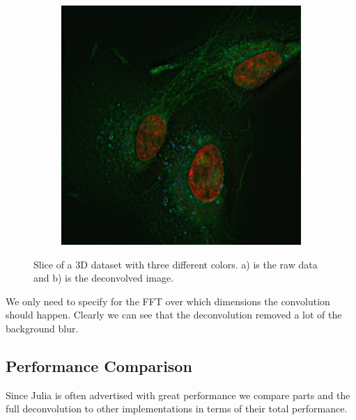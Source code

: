 \documentclass{juliacon}
\begin{document}
\begin{figure}[h]
\begin{subfigure}{.25\textwidth}
                \includegraphics[width = .85\textwidth]{figures/deconvolved_rgb.png}
            \end{subfigure}
            \caption{Slice of a 3D dataset with three different colors. a) is the raw data and b) is the
                    deconvolved image.}
            \label{fig:result_3d}
        \end{figure} 
        We only need to specify for the FFT over which dimensions the convolution should happen.
        Clearly we can see that the deconvolution removed a lot of the background blur.

    \subsection{Performance Comparison}
        Since Julia is often advertised with great performance we compare parts and the full deconvolution to other implementations in
        terms of their total performance.
\end{document}
